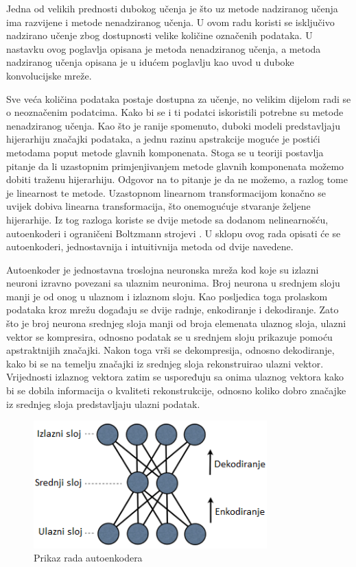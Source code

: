 \documentclass[lmodern, utf8, diplomski, numeric]{fer}
\begin{document}
Jedna od velikih prednosti dubokog učenja je što uz metode nadziranog učenja ima razvijene i metode nenadziranog učenja. U ovom radu koristi se isključivo nadzirano učenje zbog dostupnosti velike količine označenih podataka. U nastavku ovog poglavlja opisana je metoda nenadziranog učenja, a metoda nadziranog učenja opisana je u idućem poglavlju kao uvod u duboke konvolucijske mreže.

Sve veća količina podataka postaje dostupna za učenje, no velikim dijelom radi se o neoznačenim podatcima. Kako bi se i ti podatci iskoristili potrebne su metode nenadziranog učenja. Kao što je ranije spomenuto, duboki modeli predstavljaju hijerarhiju značajki podataka, a jednu razinu apstrakcije moguće je postići metodama poput metode glavnih komponenata. Stoga se u teoriji postavlja pitanje da li uzastopnim primjenjivanjem metode glavnih komponenata možemo dobiti traženu hijerarhiju. Odgovor na to pitanje je da ne možemo, a razlog tome je linearnost te metode. Uzastopnom linearnom transformacijom konačno se uvijek dobiva linearna transformacija, što onemogućuje stvaranje željene hijerarhije. Iz tog razloga koriste se dvije metode sa dodanom nelinearnošću, autoenkoderi  i ograničeni Boltzmann strojevi  \cite{hinton2006rbm}. U sklopu ovog rada opisati će se autoenkoderi, jednostavnija i intuitivnija metoda od dvije navedene.

Autoenkoder je jednostavna troslojna neuronska mreža kod koje su izlazni neuroni izravno povezani sa ulaznim neuronima. Broj neurona u srednjem sloju manji je od onog u ulaznom i izlaznom sloju. Kao posljedica toga prolaskom podataka kroz mrežu događaju se dvije radnje, enkodiranje i dekodiranje. Zato što je broj neurona srednjeg sloja manji od broja elemenata ulaznog sloja, ulazni vektor se kompresira, odnosno podatak se u srednjem sloju prikazuje pomoću apstraktnijih značajki. Nakon toga vrši se dekompresija, odnosno dekodiranje, kako bi se na temelju značajki iz srednjeg sloja rekonstruirao ulazni vektor. Vrijednosti izlaznog vektora zatim se uspoređuju sa onima ulaznog vektora kako bi se dobila informacija o kvaliteti rekonstrukcije, odnosno koliko dobro značajke iz srednjeg sloja predstavljaju ulazni podatak.

\begin{figure}[ht!]
\centering
\includegraphics[width=9cm]{slike/autoencoder.png}
\caption{Prikaz rada autoenkodera}
\end{figure}
\end{document}

